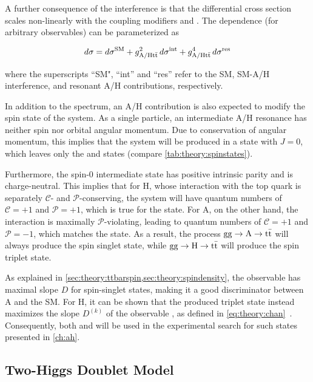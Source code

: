 A further consequence of the interference is that the differential cross section scales non-linearly with the coupling modifiers \gAtt and \gHtt. The dependence (for arbitrary observables) can be parameterized as 

\begin{equation}
\label{eq:theory:ahxs}
    d \sigma = d \sigma^{\mathrm{SM}} + g_{\mathrm{A/H t \bar{t}}}^2 \, d \sigma^{\mathrm{int}} + g_{\mathrm{A/H t \bar{t}}}^4 \, d \sigma^{\mathrm{res}}
\end{equation}

\noindent where the superscripts ``SM", ``int'' and ``res'' refer to the SM, SM-A/H interference, and resonant A/H contributions, respectively.

In addition to the \mtt spectrum, an A/H contribution is also expected to modify the spin state of the \ttbar system. As a single particle, an intermediate A/H resonance has neither spin nor orbital angular momentum. Due to conservation of angular momentum, this implies that the \ttbar system will be produced in a state with $J = 0$, which leaves only the  and  states (compare \cref{tab:theory:spinstates}).

Furthermore, the spin-0 intermediate state has positive intrinsic parity and is charge-neutral. This implies that for H, whose interaction with the top quark is separately $\mathcal{C}$- and $\mathcal{P}$-conserving, the \ttbar system will have quantum numbers of $\mathcal{C} = +1$ and $\mathcal{P} = +1$, which is true for the  state. For A, on the other hand, the interaction is maximally $\mathcal{P}$-violating, leading to quantum numbers of $\mathcal{C} = +1$ and $\mathcal{P} = -1$, which matches the  state. As a result, the process $\mathrm{gg \rightarrow A \rightarrow \mathrm{t \bar{t}}}$ will always produce the  spin singlet state, while $\mathrm{gg \rightarrow H \rightarrow \mathrm{t \bar{t}}}$ will produce the  spin triplet state.

As explained in \cref{sec:theory:ttbarspin,sec:theory:spindensity}, the observable \chel has maximal slope $D$ for spin-singlet states, making it a good discriminator between A and the SM. For H, it can be shown that the produced triplet state instead maximizes the slope $D^{(k)}$ of the observable \chan, as defined in \cref{eq:theory:chan}~\cite{Maltoni:2024tul}. Consequently, both \chel and \chan will be used in the experimental search for such states presented in \cref{ch:ah}.

\subsection{Two-Higgs Doublet Model}
\label{sec:theory:twohdm}

